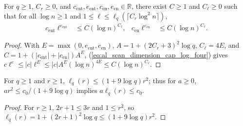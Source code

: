 \begin{lemma}
    \label{thm:al_scan_transport_coefficients_log}
    \leanok
    For $q\ge1$, $C_r\ge0$, and
    $c_{\mathrm{ent}},e_{\mathrm{ent}},c_{\mathrm{en}},e_{\mathrm{en}}\in\mathbb R$,
    there exist $C\ge1$ and $C_\ell\ge0$ such that for all $\log n\ge1$ and
    $1\le\ell\le\ell_q(\lceil C_r\log^2 n\rceil)$,
    \begin{align}
        c_{\mathrm{ent}}\ell^{e_{\mathrm{ent}}} & \le C(\log n)^{C_\ell}, &
        c_{\mathrm{en}}\ell^{e_{\mathrm{en}}}   & \le C(\log n)^{C_\ell}.
        \label{eq:al_scan_transport_coefficients_log}
    \end{align}
\end{lemma}
\begin{proof}\leanok
    With $E=\max(0,e_{\mathrm{ent}},e_{\mathrm{en}})$,
    $A=1+(2C_r+3)^2\log q$, $C_\ell=4E$, and
    $C=1+(|c_{\mathrm{ent}}|+|c_{\mathrm{en}}|)A^E$,
    (\ref{eq:al_scan_dimension_cap_log_four}) gives
    $c\ell^e\le|c|\ell^E\le|c|A^E(\log n)^{4E}\le C(\log n)^{C_\ell}$.
\end{proof}

\begin{lemma}
    \label{thm:al_scan_radius_dimension_smallness}
    \leanok
    For $q\ge1$ and $r\ge1$, $\ell_q(r)\le(1+9\log q)r^2$; thus for $a\ge0$,
    $ar^2\le c_0/(1+9\log q)$ implies $a\ell_q(r)\le c_0$.
\end{lemma}
\begin{proof}\leanok
    For $r\ge1$, $2r+1\le3r$ and $1\le r^2$, so
    $\ell_q(r)=1+(2r+1)^2\log q\le(1+9\log q)r^2$.
\end{proof}

